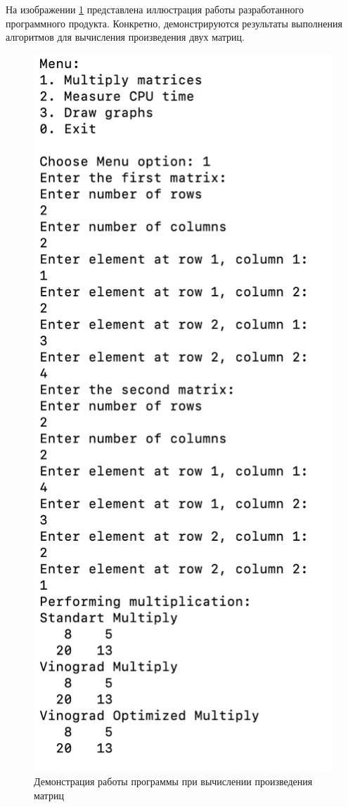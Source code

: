 На изображении \ref{img:demonstration} представлена иллюстрация работы разработанного программного продукта. 
Конкретно, демонстрируются результаты выполнения алгоритмов для вычисления произведения двух матриц. 
\clearpage
\begin{figure}[h]
	\centering
	\includegraphics[height=0.7\textheight]{img/example.png}
	\caption{Демонстрация работы программы при вычислении произведения матриц}
	\label{img:demonstration}
\end{figure}

